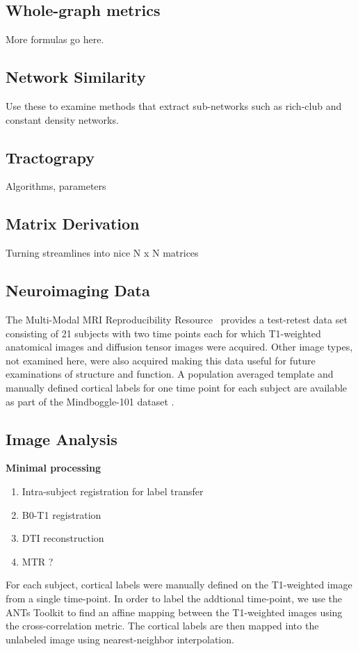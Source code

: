 \documentclass{frontiersSCNS} %
\begin{document}
\subsection{Whole-graph metrics}
More formulas go here.

\subsection{Network Similarity}
Use these to examine methods that extract sub-networks such as rich-club and constant density networks.


\subsection{Tractograpy}
Algorithms, parameters

\subsection{Matrix Derivation}
Turning streamlines into nice N x N matrices

\subsection{Neuroimaging Data}
The Multi-Modal MRI Reproducibility Resource~\citep{Landman2011}
provides a test-retest data set consisting of 21 subjects with two
time points each for which T1-weighted anatomical images and diffusion
tensor images were acquired. Other image types, not examined here,
were also acquired making this data useful for future examinations of
structure and function.  A population averaged template and manually
defined cortical labels for one time point for each subject are
available as part of the Mindboggle-101 dataset \citep{Klein2012}.

\subsection{Image Analysis}

\textbf{Minimal processing}
\begin{enumerate}
\item Intra-subject registration for label transfer
\item B0-T1 registration
\item DTI reconstruction
\item MTR ?
\end{enumerate}
For each subject, cortical labels were manually defined on the
T1-weighted image from a single time-point. In order to label the
addtional time-point, we use the ANTs Toolkit to find an affine
mapping between the T1-weighted images using the cross-correlation
metric. The cortical labels are then mapped into the unlabeled image
using nearest-neighbor interpolation.
\end{document}
